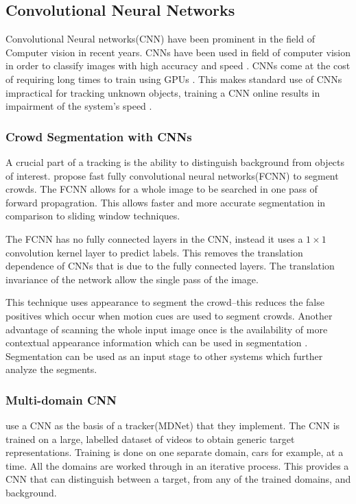 \subsection{Convolutional Neural Networks}
  Convolutional Neural networks(CNN) have been prominent in the field of Computer vision in recent years.
  CNNs have been used in field of computer vision in order to classify images with high accuracy and speed \cite{razavian2014}.
  CNNs come at the cost of requiring long times to train using GPUs \cite{krizhevsky2012}.
  This makes standard use of CNNs impractical for tracking unknown objects, training a CNN online results in impairment of the system's speed \cite{bertinetto2016}.

  \subsubsection{Crowd Segmentation with CNNs}
  A crucial part of a tracking is the ability to distinguish background from objects of interest.
  \citeauthor{kang2014} \cite{kang2014} propose fast fully convolutional neural networks(FCNN) to segment crowds.
  The FCNN allows for a whole image to be searched in one pass of forward propagration.
  This allows faster and more accurate segmentation in comparison to sliding window techniques.

  The FCNN has no fully connected layers in the CNN, instead it uses a $1 \times 1$ convolution kernel layer to predict labels.
  This removes the translation dependence of CNNs that is due to the fully connected layers.
  The translation invariance of the network allow the single pass of the image.

  This technique uses appearance to segment the crowd--this reduces the false positives which occur when motion cues are used to segment crowds.
  Another advantage of scanning the whole input image once is the availability of more contextual appearance information which can be used in segmentation \cite{eigenFacesRecog, farabet2012}.
  Segmentation can be used as an input stage to other systems which further analyze the segments.



  \subsubsection{Multi-domain CNN}
  \citeauthor{CNNTracking} \cite{CNNTracking} use a CNN as the basis of a tracker(MDNet) that they implement.
  The CNN is trained on a large, labelled dataset of videos to obtain generic target representations.
  Training is done on one separate domain, cars for example, at a time. 
  All the domains are worked through in an iterative process.
  This provides a CNN that can distinguish between a target, from any of the trained domains, and background.

